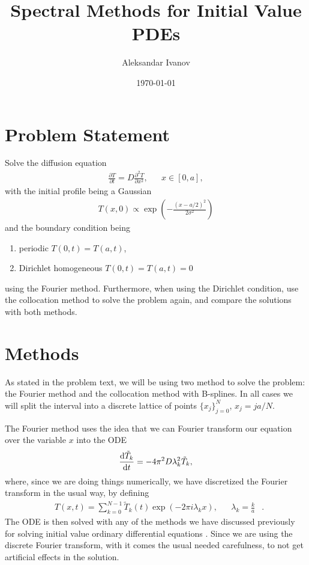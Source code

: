 \documentclass[10pt,a4paper,twocolumn]{article}
\begin{document}
\title{Spectral Methods for Initial Value PDEs}
\author{Aleksandar Ivanov}
\date{\today}
\maketitle

\section{Problem Statement}

Solve the diffusion equation
%
\begin{align}\label{eq:dif}
    &\frac{\partial T}{\partial t} = D \frac{\partial^2 T}{\partial x^2},& &x \in [0, a],&
\end{align}
%
with the initial profile being a Gaussian
%
\begin{align}
    T(x, 0) \propto \exp \left(- \frac{(x - a/2)^2}{2 \sigma^2} \right)
\end{align}
and the boundary condition being
%
\begin{enumerate}
    \item periodic $T(0, t) = T(a, t)$,
    \item Dirichlet homogeneous $T(0, t) = T(a, t) = 0$
\end{enumerate}
%
using the Fourier method. Furthermore, when using the Dirichlet condition, use the collocation method to solve the problem again, and compare the solutions with both methods.


\section{Methods}

As stated in the problem text, we will be using two method to solve the problem: the Fourier method and the collocation method with B-splines. In all cases we will split the interval into a discrete lattice of points $\{ x_j\}_{j=0}^{N}$, $x_j = j a/N $.

The Fourier method uses the idea that we can Fourier transform our equation over the variable $x$ into the ODE
%
\begin{align}
    \frac{\dif \tilde{T}_k}{\dif t} = - 4 \pi^2 D \lambda_k^2 \tilde{T}_k,
\end{align}
%
where, since we are doing things numerically, we have discretized the Fourier transform in the usual way, by defining
%
\begin{align}
    &T(x, t) = \sum_{k=0}^{N-1} \tilde{T}_k(t) \exp(- 2 \pi i \lambda_k x),& &\lambda_k = \frac{k}{a}&.
\end{align}
%
The ODE is then solved with any of the methods we have discussed previously for solving initial value ordinary differential equations \cite{me2}. Since we are using the discrete Fourier transform, with it comes the usual needed carefulness, to not get artificial effects in the solution.
\end{document}
